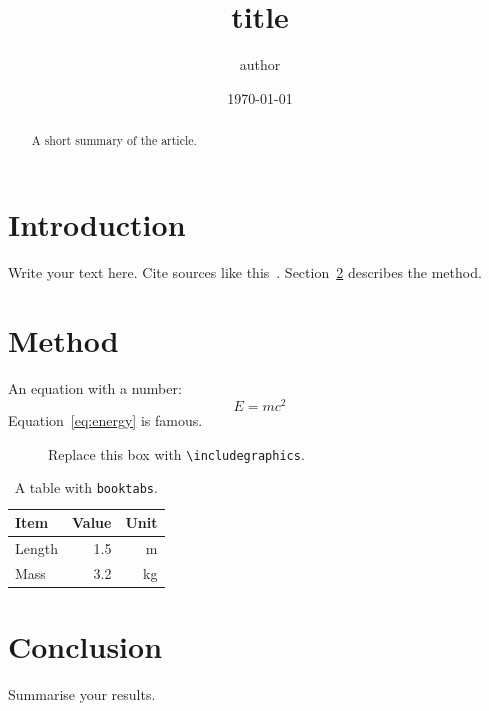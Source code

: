 \documentclass[11pt,a4paper]{article}
\title{{{title}}}
\author{{{author}}}
\date{\today}
\begin{document}
\maketitle

\begin{abstract}
  A short summary of the article.
\end{abstract}

\section{Introduction}
\label{sec:intro}
Write your text here. Cite sources like this~\cite{knuth1984}.
Section~\ref{sec:method} describes the method.

\section{Method}
\label{sec:method}
An equation with a number:
\begin{equation}
  E = mc^2 \label{eq:energy}
\end{equation}
Equation~\eqref{eq:energy} is famous.

\begin{figure}[htbp]
  \centering
  \fbox{\rule{0pt}{3cm}\rule{0.6\linewidth}{0pt}}
  \caption{Replace this box with \texttt{\textbackslash includegraphics}.}
  \label{fig:placeholder}
\end{figure}

\begin{table}[htbp]
  \centering
  \begin{tabular}{lrr}
    \toprule
    Item & Value & Unit \\
    \midrule
    Length & 1.5 & m \\
    Mass   & 3.2 & kg \\
    \bottomrule
  \end{tabular}
  \caption{A table with \texttt{booktabs}.}
  \label{tab:values}
\end{table}

\section{Conclusion}
Summarise your results.



\end{document}
